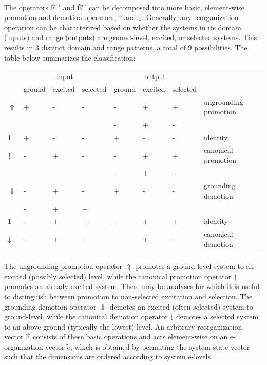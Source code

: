   The operators Ê\textsuperscript{cr} and Ê\textsuperscript{sr} can be decomposed into more basic, element-wise promotion and demotion operators, ↑ and ↓. Generally, any reorganization operation can be characterized based on whether the systems in its domain (inputs) and range (outputs) are ground-level, excited, or selected systems. This results in 3 distinct domain and range patterns, a total of 9 possibilities. The table below summarizes the classification:

\begin{tabularx}{\textwidth}{XXXXXXXX} & \multicolumn{3}{c}{ input} & \multicolumn{3}{c}{ output} & \\
\lsptoprule
& ground & excited & selected & ground & excited & selected & \\
 $\Uparrow $ & + & {}- & {}- & {}- & + & + & ungrounding promotion\\
&  &  &  & {}- & + & {}- & \\
 1 & + & {}- & {}- & + & {}- & {}- & identity\\
 ↑ & {}- & + & {}- & {}- & + & + & canonical promotion\\
&  &  &  & {}- & + & {}- & \\
 $\Downarrow $ & {}- & + & {}- & + & {}- & {}- & grounding demotion\\
& {}- & + & + &  &  &  & \\
 1 & {}- & + & + & {}- & + & + & identity\\
 ↓ & {}- & + & + & {}- & + & {}- & canonical demotion\\
\lspbottomrule
\end{tabularx}
  The ungrounding promotion operator $\Uparrow $ promotes a ground-level system to an excited (possibly selected) level, while the canonical promotion operator ↑ promotes an already excited system. There may be analyses for which it is useful to distinguish between promotion to non-selected excitation and selection. The grounding demotion operator $\Downarrow $ demotes an excited (often selected) system to ground-level, while the  canonical demotion operator ↓ demotes a selected system to an above-ground (typically the lowest) level. An arbitrary reorganization vector Ê consists of these basic operations and acts element-wise on an e-organization vector  $\widetilde{{e}}$, which is obtained by permuting the system state vector such that the dimensions are ordered according to system e-levels.


